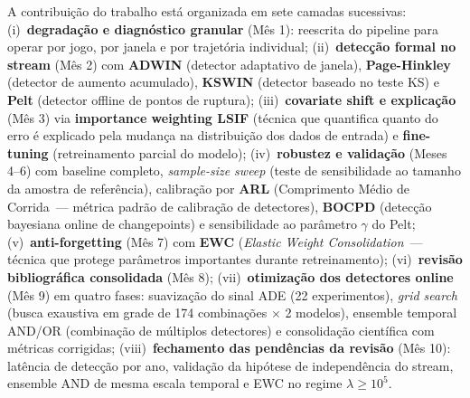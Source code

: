\documentclass[11pt,a4paper]{article}
\begin{document}
A contribui\c{c}\~ao do trabalho est\'a organizada em sete camadas sucessivas:
(i)~\textbf{degrada\c{c}\~ao e diagn\'ostico granular} (M\^es 1): reescrita do pipeline para operar por jogo, por janela e por trajet\'oria individual;
(ii)~\textbf{detec\c{c}\~ao formal no stream} (M\^es 2) com \textbf{ADWIN} (detector adaptativo de janela), \textbf{Page-Hinkley} (detector de aumento acumulado), \textbf{KSWIN} (detector baseado no teste KS) e \textbf{Pelt} (detector offline de pontos de ruptura);
(iii)~\textbf{covariate shift e explica\c{c}\~ao} (M\^es 3) via \textbf{importance weighting LSIF} (t\'ecnica que quantifica quanto do erro \'e explicado pela mudan\c{c}a na distribui\c{c}\~ao dos dados de entrada) e \textbf{fine-tuning} (retreinamento parcial do modelo);
(iv)~\textbf{robustez e valida\c{c}\~ao} (Meses 4--6) com baseline completo, \emph{sample-size sweep} (teste de sensibilidade ao tamanho da amostra de refer\^encia), calibra\c{c}\~ao por \textbf{ARL} (Comprimento M\'edio de Corrida~--- m\'etrica padr\~ao de calibra\c{c}\~ao de detectores), \textbf{BOCPD} (detec\c{c}\~ao bayesiana online de changepoints) e sensibilidade ao par\^ametro $\gamma$ do Pelt;
(v)~\textbf{anti-forgetting} (M\^es 7) com \textbf{EWC} \cite{kirkpatrick2017} (\emph{Elastic Weight Consolidation}~--- t\'ecnica que protege par\^ametros importantes durante retreinamento);
(vi)~\textbf{revis\~ao bibliogr\'afica consolidada} (M\^es 8);
(vii)~\textbf{otimiza\c{c}\~ao dos detectores online} (M\^es 9) em quatro fases: suaviza\c{c}\~ao do sinal ADE (22 experimentos), \emph{grid search} (busca exaustiva em grade de 174 combina\c{c}\~oes $\times$ 2 modelos), ensemble temporal AND/OR (combina\c{c}\~ao de m\'ultiplos detectores) e consolida\c{c}\~ao cient\'ifica com m\'etricas corrigidas;
(viii)~\textbf{fechamento das pend\^encias da revis\~ao} (M\^es 10): lat\^encia de detec\c{c}\~ao por ano, valida\c{c}\~ao da hip\'otese de independ\^encia do stream, ensemble AND de mesma escala temporal e EWC no regime $\lambda\!\geq\!10^5$.
\end{document}
